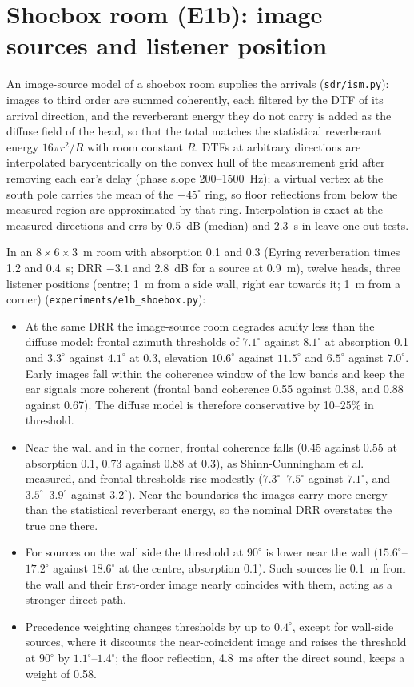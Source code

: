 \documentclass[10pt]{article}
\theoremstyle{definition}
\begin{document}
\section{Shoebox room (E1b): image sources and listener position}
An image-source model of a shoebox room supplies the arrivals (\texttt{sdr/ism.py}): images to third order are summed coherently, each filtered by the DTF of its arrival direction, and the reverberant energy they do not carry is added as the diffuse field of the head, so that the total matches the statistical reverberant energy $16\pi r^2/R$ with room constant $R$. DTFs at arbitrary directions are interpolated barycentrically on the convex hull of the measurement grid after removing each ear's delay (phase slope 200--1500~Hz); a virtual vertex at the south pole carries the mean of the $-45^\circ$ ring, so floor reflections from below the measured region are approximated by that ring. Interpolation is exact at the measured directions and errs by 0.5~dB (median) and 2.3~\textmu s in leave-one-out tests.

In an $8\times6\times3$~m room with absorption 0.1 and 0.3 (Eyring reverberation times 1.2 and 0.4~s; DRR $-3.1$ and 2.8~dB for a source at 0.9~m), twelve heads, three listener positions (centre; 1~m from a side wall, right ear towards it; 1~m from a corner) (\texttt{experiments/e1b\_shoebox.py}):
\begin{itemize}
\item At the same DRR the image-source room degrades acuity less than the diffuse model: frontal azimuth thresholds of $7.1^\circ$ against $8.1^\circ$ at absorption 0.1 and $3.3^\circ$ against $4.1^\circ$ at 0.3, elevation $10.6^\circ$ against $11.5^\circ$ and $6.5^\circ$ against $7.0^\circ$. Early images fall within the coherence window of the low bands and keep the ear signals more coherent (frontal band coherence 0.55 against 0.38, and 0.88 against 0.67). The diffuse model is therefore conservative by 10--25\% in threshold.
\item Near the wall and in the corner, frontal coherence falls (0.45 against 0.55 at absorption 0.1, 0.73 against 0.88 at 0.3), as Shinn-Cunningham et al.~\cite{shinn2005} measured, and frontal thresholds rise modestly ($7.3^\circ$--$7.5^\circ$ against $7.1^\circ$, and $3.5^\circ$--$3.9^\circ$ against $3.2^\circ$). Near the boundaries the images carry more energy than the statistical reverberant energy, so the nominal DRR overstates the true one there.
\item For sources on the wall side the threshold at $90^\circ$ is lower near the wall ($15.6^\circ$--$17.2^\circ$ against $18.6^\circ$ at the centre, absorption 0.1). Such sources lie 0.1~m from the wall and their first-order image nearly coincides with them, acting as a stronger direct path.
\item Precedence weighting changes thresholds by up to $0.4^\circ$, except for wall-side sources, where it discounts the near-coincident image and raises the threshold at $90^\circ$ by $1.1^\circ$--$1.4^\circ$; the floor reflection, 4.8~ms after the direct sound, keeps a weight of 0.58.
\end{itemize}
\end{document}
